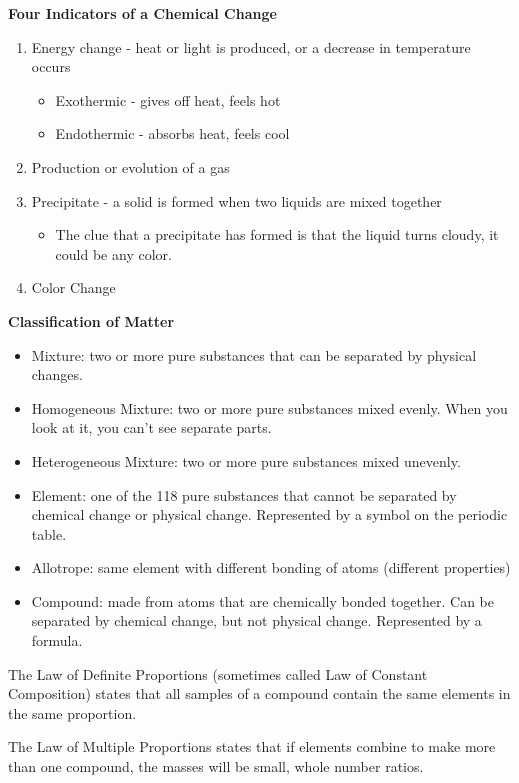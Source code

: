 \documentclass[../hchem.tex]{subfiles}
\begin{document}
\textbf{Four Indicators of a Chemical Change}
\begin{enumerate}
    \item Energy change - heat or light is produced, or a decrease in temperature occurs 
    \begin{itemize}
        \item Exothermic - gives off heat, feels hot 
        \item Endothermic - absorbs heat, feels cool 
    \end{itemize}
    \item Production or evolution of a gas 
    \item Precipitate - a solid is formed when two liquids are mixed together
    \begin{itemize}
        \item The clue that a precipitate has formed is that the liquid turns cloudy, it could be any color.
    \end{itemize}
    \item Color Change 
\end{enumerate}

\textbf{Classification of Matter}
\begin{itemize}
    \item Mixture: two or more pure substances that can be separated by physical changes.
    \item Homogeneous Mixture: two or more pure substances mixed evenly. When you look at it, you can't see separate parts.
    \item Heterogeneous Mixture: two or more pure substances mixed unevenly.
    \item Element: one of the 118 pure substances that cannot be separated by chemical change or physical change. Represented by a symbol on the periodic table.
    \item Allotrope: same element with different bonding of atoms (different properties)
    \item Compound: made from atoms that are chemically bonded together. Can be separated by chemical change, but not physical change. Represented by a formula.
\end{itemize}

The Law of Definite Proportions (sometimes called Law of Constant Composition) states that all samples of a compound 
contain the same elements in the same proportion.

The Law of Multiple Proportions states that if elements combine to make more than one compound, the masses will be small, whole number ratios.
\end{document}
